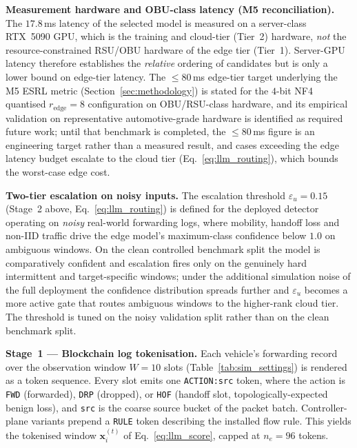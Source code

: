 \documentclass[12pt, a4paper]{report}
\newcommand{\mypar}{\vspace{0.8em}\noindent}
\begin{document}
\mypar
\textbf{Measurement hardware and OBU-class latency (M5 reconciliation).}
The $17.8$\,ms latency of the selected model is measured on a server-class
RTX~5090 GPU, which is the training and cloud-tier (Tier~2) hardware, \emph{not}
the resource-constrained RSU/OBU hardware of the edge tier (Tier~1). Server-GPU
latency therefore establishes the \emph{relative} ordering of candidates but is
only a lower bound on edge-tier latency. The $\leq 80$\,ms edge-tier target underlying the M5 ESRL
metric (Section~\ref{sec:methodology}) is stated for the $4$-bit NF4 quantised
$r_{\text{edge}}=8$ configuration on OBU/RSU-class hardware, and its empirical
validation on representative automotive-grade hardware is identified as required
future work; until that benchmark is
completed, the $\leq 80$\,ms figure is an engineering target rather than a
measured result, and cases exceeding the edge latency budget escalate to the
cloud tier (Eq.~\eqref{eq:llm_routing}), which bounds the worst-case edge cost.

\mypar
\textbf{Two-tier escalation on noisy inputs.}
The escalation threshold $\varepsilon_u = 0.15$ (Stage~2 above,
Eq.~\eqref{eq:llm_routing}) is defined for the deployed detector operating on
\emph{noisy} real-world forwarding logs, where mobility, handoff loss and
non-IID traffic drive the edge model's maximum-class confidence below $1.0$ on
ambiguous windows. On the clean controlled benchmark split the model is
comparatively confident and escalation fires only on the genuinely hard
intermittent and target-specific windows; under the additional simulation noise
of the full deployment the confidence distribution spreads further and
$\varepsilon_u$ becomes a more active gate that routes ambiguous windows to the
higher-rank cloud tier. The threshold is tuned on the noisy validation split
rather than on the clean benchmark split.

\mypar
\textbf{Stage~1 --- Blockchain log tokenisation.} Each vehicle's forwarding
record over the observation window $W = 10$ slots (Table~\ref{tab:sim_settings})
is rendered as a token sequence. Every slot emits one \texttt{ACTION:src} token,
where the action is \texttt{FWD} (forwarded), \texttt{DRP} (dropped), or
\texttt{HOF} (handoff slot, topologically-expected benign loss), and \texttt{src}
is the coarse source bucket of the packet batch. Controller-plane variants
prepend a \texttt{RULE} token describing the installed flow rule. This yields the
tokenised window $\mathbf{x}_i^{(t)}$ of Eq.~\eqref{eq:llm_score}, capped at
$n_e = 96$ tokens.
\end{document}
